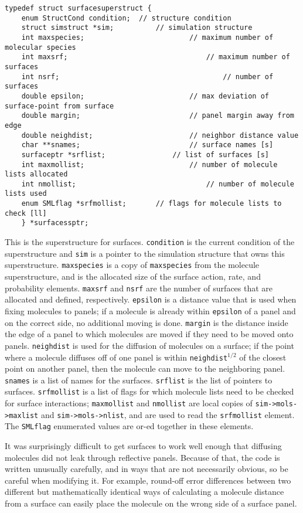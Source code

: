 \documentclass {book}
\begin{document}
\begin{lstlisting}
typedef struct surfacesuperstruct {
	enum StructCond condition;	// structure condition
	struct simstruct *sim;			// simulation structure
	int maxspecies;							// maximum number of molecular species
	int maxsrf;									// maximum number of surfaces
	int nsrf;										// number of surfaces
	double epsilon;							// max deviation of surface-point from surface
	double margin;							// panel margin away from edge
	double neighdist;						// neighbor distance value
	char **snames;							// surface names [s]
	surfaceptr *srflist;				// list of surfaces [s]
	int maxmollist;							// number of molecule lists allocated
	int nmollist;								// number of molecule lists used
	enum SMLflag *srfmollist;		// flags for molecule lists to check [ll]
	} *surfacessptr;
\end{lstlisting}

This is the superstructure for surfaces. \texttt{condition} is the current condition of the superstructure and \texttt{sim} is a pointer to the simulation structure that owns this superstructure. \texttt{maxspecies} is a copy of \texttt{maxspecies} from the molecule superstructure, and is the allocated size of the surface action, rate, and probability elements. \texttt{maxsrf} and \texttt{nsrf} are the number of surfaces that are allocated and defined, respectively. \texttt{epsilon} is a distance value that is used when fixing molecules to panels; if a molecule is already within \texttt{epsilon} of a panel and on the correct side, no additional moving is done. \texttt{margin} is the distance inside the edge of a panel to which molecules are moved if they need to be moved onto panels. \texttt{neighdist} is used for the diffusion of molecules on a surface; if the point where a molecule diffuses off of one panel is within \texttt{neighdist}$^{1/2}$ of the closest point on another panel, then the molecule can move to the neighboring panel. \texttt{snames} is a list of names for the surfaces. \texttt{srflist} is the list of pointers to surfaces. \texttt{srfmollist} is a list of flags for which molecule lists need to be checked for surface interactions; \texttt{maxmollist} and \texttt{nmollist} are local copies of \texttt{sim->mols->maxlist} and \texttt{sim->mols->nlist}, and are used to read the \texttt{srfmollist} element. The \texttt{SMLflag} enumerated values are or-ed together in these elements.

It was surprisingly difficult to get surfaces to work well enough that diffusing molecules did not leak through reflective panels. Because of that, the code is written unusually carefully, and in ways that are not necessarily obvious, so be careful when modifying it. For example, round-off error differences between two different but mathematically identical ways of calculating a molecule distance from a surface can easily place the molecule on the wrong side of a surface panel.
\end{document}
